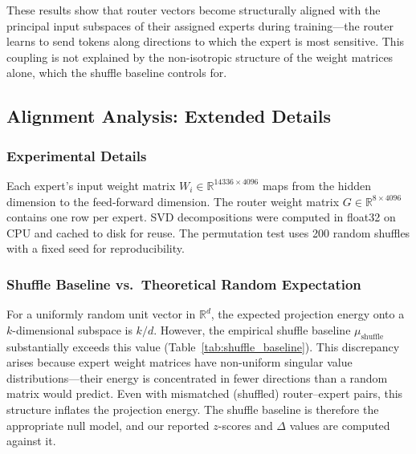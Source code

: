 These results show that router vectors become structurally aligned with the principal input subspaces of their assigned experts during training---the router learns to send tokens along directions to which the expert is most sensitive. This coupling is not explained by the non-isotropic structure of the weight matrices alone, which the shuffle baseline controls for.



\subsection{Alignment Analysis: Extended Details}
\label{app:alignment}

\subsubsection{Experimental Details}

Each expert's input weight matrix $W_i \in \mathbb{R}^{14336 \times 4096}$ maps from the hidden dimension to the feed-forward dimension. The router weight matrix $G \in \mathbb{R}^{8 \times 4096}$ contains one row per expert. SVD decompositions were computed in float32 on CPU and cached to disk for reuse. The permutation test uses 200 random shuffles with a fixed seed for reproducibility.

\subsubsection{Shuffle Baseline vs.\ Theoretical Random Expectation}

For a uniformly random unit vector in $\mathbb{R}^d$, the expected projection energy onto a $k$-dimensional subspace is $k/d$. However, the empirical shuffle baseline $\mu_{\text{shuffle}}$ substantially exceeds this value (Table~\ref{tab:shuffle_baseline}). This discrepancy arises because expert weight matrices have non-uniform singular value distributions---their energy is concentrated in fewer directions than a random matrix would predict. Even with mismatched (shuffled) router--expert pairs, this structure inflates the projection energy. The shuffle baseline is therefore the appropriate null model, and our reported $z$-scores and $\Delta$ values are computed against it.

